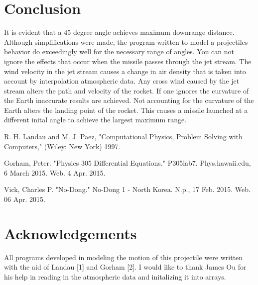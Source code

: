 \documentclass[11pt]{article}
\begin{document}
\section{Conclusion}
It is evident that a 45 degree angle achieves maximum downrange distance.  Although simplifications were made, the program 
written to model a projectiles behavior do exceedingly well for the necessary range of angles.  You can not ignore the 
effects that occur when the missile passes through the jet stream.  The wind velocity in the jet stream causes a change 
in air density that is taken into account by interpolation atmospheric data.  Any cross wind caused by the jet stream 
alters the path and velocity of the rocket.  If one ignores the curvature of the Earth inaccurate results are achieved.  
Not accounting for the curvature of the Earth alters the landing point of the rocket.  This causes a missile launched at 
a different inital angle to achieve the largest maximum range. 


\setlength{\parindent}{0cm}

\begin{thebibliography}{99}  %

 R. H. Landau and M. J. Paez, "Computational Physics, Problem Solving with Computers," (Wiley: New York) 1997.


 Gorham, Peter. "Physics 305 Differential Equations." P305lab7. Phys.hawaii.edu, 6 March 2015. Web. 4 Apr. 2015.

 Vick, Charles P. "No-Dong." No-Dong 1 - North Korea. N.p., 17 Feb. 2015. Web. 06 Apr. 2015.

\end{thebibliography}

\section*{Acknowledgements}
All programs developed in modeling the motion of this projectile were written with the aid of Landau [1] and Gorham [2].  
I would like to thank James Ou for his help in reading in the atmospheric data and initalizing it into arrays.
\end{document}
